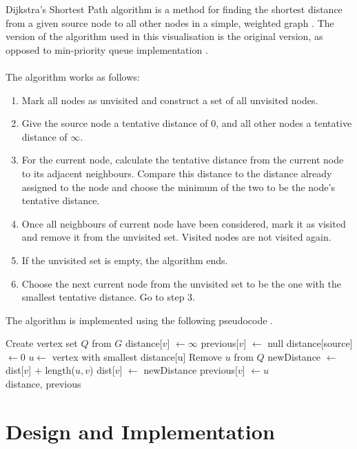 \documentclass[11pt,a4paper]{article}
\begin{document}
Dijkstra's Shortest Path algorithm is a method for finding the shortest distance from a given
source node to all other nodes in a simple, weighted graph \cite{djikstra1959note}. The version of the algorithm
used in this visualisation is the original version, as opposed to min-priority queue implementation \cite{fredman1987fibonacci}.
\\
\\
The algorithm works as follows:
\begin{enumerate}
	\item Mark all nodes as unvisited and construct a set of all unvisited nodes.
	\item Give the source node a tentative distance of 0, and all other nodes a tentative distance of $\infty$.
	\item For the current node, calculate the tentative distance from the current node to its adjacent neighbours.
	Compare this distance to the distance already assigned to the node and choose the minimum of the two to be
	the node's tentative distance.
	\item Once all neighbours of current node have been considered, mark it as visited and remove it from the
	unvisited set. Visited nodes are not visited again.
	\item If the unvisited set is empty, the algorithm ends.
	\item Choose the next current node from the unvisited set to be the one with the smallest tentative distance.
	Go to step 3.
\end{enumerate}
\newpage
\noindent
The algorithm is implemented using the following pseudocode \cite{wiki:code}.
\\
\begin{algorithmic}

\State Create vertex set $Q$ from $G$
\State distance[$v$] $\leftarrow \infty$
\State previous[$v$] $\leftarrow$ null 
\EndFor
\State distance[source] $\leftarrow 0$
\State $u \leftarrow$ vertex with smallest distance[u]
\State Remove $u$ from $Q$
\State newDistance $\leftarrow$ dist[$v$] + length($u,v$)
\State dist[$v$] $\leftarrow$ newDistance
\State previous[$v$] $\leftarrow u$ 
\EndIf
\EndFor
\EndWhile
\\
\Return distance, previous
\EndFunction
\end{algorithmic}

\section*{Design and Implementation}
\end{document}
